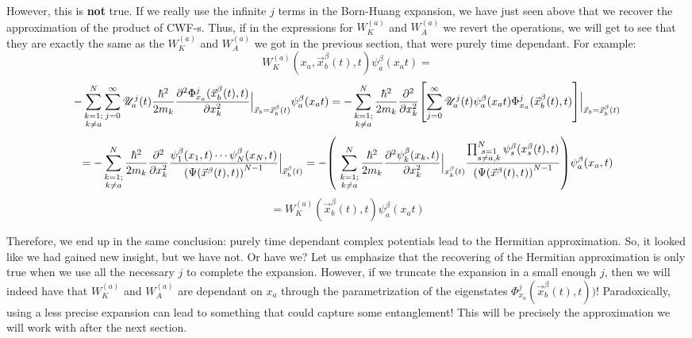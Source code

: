\documentclass[11pt, a4paper]{article} %
\newcommand{\s}{\mathbb{S}}
\newcommand{\U}{\mathscr{U}}
\begin{document}
However, this is {\bf not} true. If we really use the infinite $j$ terms in the Born-Huang expansion, we have just seen above that we recover the approximation of the product of CWF-s. Thus, if in the expressions for $W^{(a)}_K$ and $W^{(a)}_A$ we revert the operations, we will get to see that they are exactly the same as the $W^{(a)}_K$ and $W^{(a)}_A$ we got in the previous section, that were purely time dependant. For example:
$$
W_K^{(a)}(x_a, \vec{x}_b^\beta (t),t)\psi_a^\beta(x_a t)=
$$
$$
- \sum_{\substack{k=1; \\ k\neq a}}^{N} \sum_{j=0}^\infty \U^j_a(t) \frac{\hbar^2}{2m_k} \pdv[2]{ \Phi_{x_a}^j(\vec{x}_b^\beta(t),t)}{x_k}\Big\rvert_{\vec{x}_b=\vec{x}_b^\beta(t)} \psi_a^\beta(x_a t)=- \sum_{\substack{k=1; \\ k\neq a}}^{N}  \frac{\hbar^2}{2m_k} \pdv[2]{}{x_k}\qty[\sum_{j=0}^\infty  \U^j_a(t)\psi_a^\beta(x_a t) \Phi_{x_a}^j(\vec{x}_b^\beta(t),t)]\Big\rvert_{\vec{x}_b=\vec{x}_b^\beta(t)}
$$
$$
=- \sum_{\substack{k=1; \\ k\neq a}}^{N}  \frac{\hbar^2}{2m_k} \pdv[2]{}{x_k} \frac{\psi^\beta_1(x_1,t)\cdots \psi^\beta_N(x_N,t)}{\qty(\Psi(\vec{x}^\beta(t),t))^{N-1}} \Big\rvert_{\vec{x}_b^\beta(t)}=- \qty(\ \sum_{\substack{k=1; \\ k\neq a}}^{N} \frac{\hbar^2}{2m_k}\pdv[2]{\psi_k^\beta(x_k,t)}{x_k}\Big\rvert_{x_k^\beta(t)}\frac{\prod_{\substack{s=1\\s\neq a,k}}^{N} \psi_s^\beta(x_s^\beta(t),t) }{\qty(\Psi(\vec{x}^\beta(t),t))^{N-1}} )\psi_a^\beta(x_a,t) 
$$
$$
=W_K^{(a)}(\vec{x}_b^\beta (t),t)\psi_a^\beta(x_a t)
$$

Therefore, we end up in the same  conclusion: purely time dependant complex potentials lead to the Hermitian approximation. So, it looked like we had gained new insight, but we have not. Or have we? Let us emphasize that the recovering of the Hermitian approximation is only true when we use all the necessary $j$ to complete the expansion. However, if we truncate the expansion in a small enough $j$, then we will indeed have that $W^{(a)}_K$ and $W^{(a)}_A$ are dependant on $x_a$ through the parametrization of the eigenstates $\Phi_{x_a}^j(\vec{x}_b^\beta(t),t))$! Paradoxically, using a less precise expansion can lead to something that could capture some entanglement! This will be precisely the approximation we will work with after the next section.
\end{document}
